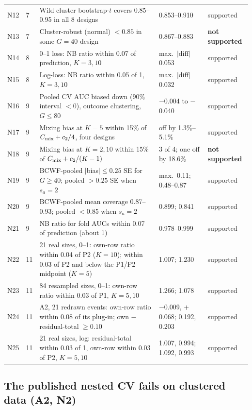 \documentclass[11pt]{amsart}
\theoremstyle{plain}
\theoremstyle{definition}
\theoremstyle{remark}
\begin{document}
\begin{table}[tbp]
\begin{tabular}{@{}l l p{8.1cm} p{4.0cm} l@{}}
N12 & 7 & Wild cluster bootstrap-$t$ covers 0.85--0.95 in all 8 designs & 0.853--0.910 & supported \\
N13 & 7 & Cluster-robust (normal) $<0.85$ in some $G=40$ design & 0.867--0.883 & \textbf{not supported} \\
N14 & 8 & 0--1 loss: NB ratio within 0.07 of prediction, $K=3,10$ & max.\ $|\text{diff}|$ 0.053 & supported \\
N15 & 8 & Log-loss: NB ratio within 0.05 of 1, $K=3,10$ & max.\ $|\text{diff}|$ 0.032 & supported \\
N16 & 9 & Pooled CV AUC biased down (90\% interval $<0$), outcome clustering, $G\le80$ & $-$0.004 to $-$0.040 & supported \\
N17 & 9 & Mixing bias at $K=5$ within 15\% of $C_{\rm mix}+c_2/4$, four designs & off by 1.3\%--5.1\% & supported \\
N18 & 9 & Mixing bias at $K=2,10$ within 15\% of $C_{\rm mix}+c_2/(K-1)$ & 3 of 4; one off by 18.6\% & \textbf{not supported} \\
N19 & 9 & BCWF-pooled $|$bias$|\le0.25$ SE for $G\ge40$; pooled $>0.25$ SE when $s_a=2$ & max.\ 0.11; 0.48--0.87 & supported \\
N20 & 9 & BCWF-pooled mean coverage 0.87--0.93; pooled $<0.85$ when $s_a=2$ & 0.899; 0.841 & supported \\
N21 & 9 & NB ratio for fold AUCs within 0.07 of prediction (about 1) & 0.978--0.999 & supported \\
N22 & 11 & 21 real sizes, 0--1: own-row ratio within 0.04 of P2 ($K=10$); within 0.03 of P2 and below the P1/P2 midpoint ($K=5$) & 1.007; 1.230 & supported \\
N23 & 11 & 84 resampled sizes, 0--1: own-row ratio within 0.03 of P1, $K=5,10$ & 1.266; 1.078 & supported \\
N24 & 11 & A2, 21 redrawn events: own-row ratio within 0.08 of its plug-in; own $-$ residual-total $\ge0.10$ & $-$0.009, $+$0.068; 0.192, 0.203 & supported \\
N25 & 11 & 21 real sizes, log: residual-total within 0.03 of 1, own-row within 0.03 of P2, $K=5,10$ & 1.007, 0.994; 1.092, 0.993 & supported \\
\bottomrule
\end{tabular}
\end{table}

\subsection{The published nested CV fails on clustered data (A2, N2)}\label{sec:bht}
\end{document}
